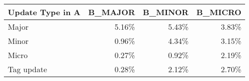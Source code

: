 \begin{tabular}{|l|rrr|}
\hline
Update Type in A & B\_MAJOR & B\_MINOR & B\_MICRO \\
\hline
Major & 5.16\% & 5.43\% & 3.83\% \\
Minor & 0.96\% & 4.34\% & 3.15\% \\
Micro & 0.27\% & 0.92\% & 2.19\% \\
Tag update & 0.28\% & 2.12\% & 2.70\% \\
\hline
\end{tabular}

